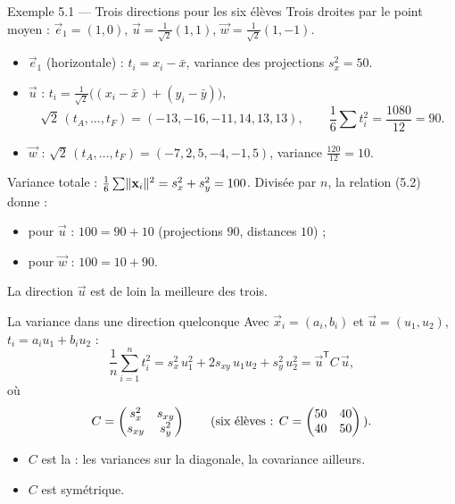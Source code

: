 \begin{frame}{Exemple 5.1 --- Trois directions pour les six élèves}
  \small Trois droites par le point moyen : $\vec e_1=(1,0)$,
  $\vec u=\frac1{\sqrt2}(1,1)$, $\vec w=\frac1{\sqrt2}(1,-1)$.
  \begin{itemize}
    \item $\vec e_1$ (horizontale) : $t_i=x_i-\bar x$, variance des
      projections $s_x^2=50$.
    \item $\vec u$ : $t_i=\frac1{\sqrt2}\big((x_i-\bar x)+(y_i-\bar y)\big)$,
      \[
        \sqrt2\,(t_A,\dots,t_F)=(-13,-16,-11,14,13,13),\qquad
        \frac16\sum t_i^2=\frac{1080}{12}=90 .
      \]
    \item $\vec w$ : $\sqrt2\,(t_A,\dots,t_F)=(-7,2,5,-4,-1,5)$, variance
      $\frac{120}{12}=10$.
  \end{itemize}
  \vspace{2pt}
  Variance totale : $\frac16\sum\lVert \mathbf{x}_i \rVert^2=s_x^2+s_y^2=100$. Divisée
  par $n$, la relation (5.2) donne :
  \begin{itemize}
    \item pour $\vec u$ : $100=90+10$ (projections $90$, distances $10$) ;
    \item pour $\vec w$ : $100=10+90$.
  \end{itemize}
  La direction $\vec u$ est de loin la meilleure des trois.
\end{frame}

\begin{frame}{La variance dans une direction quelconque}
  Avec $\vec x_i=(a_i,b_i)$ et $\vec u=(u_1,u_2)$, $t_i=a_iu_1+b_iu_2$ :
  \[
    \frac1n\sum_{i=1}^n t_i^2
    =s_x^2\,u_1^2+2s_{xy}\,u_1u_2+s_y^2\,u_2^2
    =\vec u^{\mathsf T}C\,\vec u, \tag{5.3}
  \]
  où
  \[
    C=\begin{pmatrix}s_x^2 & s_{xy}\\ s_{xy} & s_y^2\end{pmatrix}
    \qquad\text{(six élèves : }C=\begin{pmatrix}50 & 40\\ 40 & 50\end{pmatrix}\text{)}.
  \]
  \begin{itemize}
    \item $C$ est la  : les variances sur la
      diagonale, la covariance ailleurs.
    \item $C$ est symétrique.
  \end{itemize}
\end{frame}

